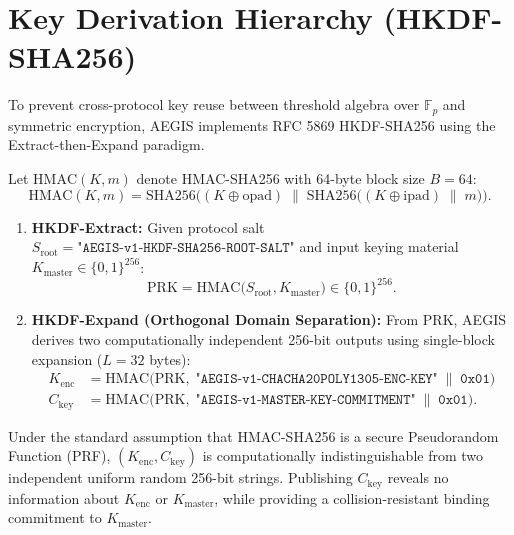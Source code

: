 \documentclass[11pt,a4paper]{article}
\theoremstyle{definition}
\newcommand{\Fp}{\mathbb{F}_p}
\newcommand{\concat}{\;\|\;}
\begin{document}
\section{Key Derivation Hierarchy (HKDF-SHA256)}

To prevent cross-protocol key reuse between threshold algebra over $\Fp$ and symmetric encryption, AEGIS implements RFC 5869 HKDF-SHA256 using the Extract-then-Expand paradigm.

Let $\mathrm{HMAC}(K, m)$ denote HMAC-SHA256 with 64-byte block size $B = 64$:
\begin{equation}
    \mathrm{HMAC}(K, m) = \mathrm{SHA256}\Big( (K \oplus \mathrm{opad}) \concat \mathrm{SHA256}\big( (K \oplus \mathrm{ipad}) \concat m \big) \Big).
\end{equation}

\begin{enumerate}[label=\textbf{Stage \arabic*:}]
    \item \textbf{HKDF-Extract:} Given protocol salt $S_{\mathrm{root}} = \texttt{"AEGIS-v1-HKDF-SHA256-ROOT-SALT"}$ and input keying material $K_{\mathrm{master}} \in \{0,1\}^{256}$:
    \begin{equation}
        \mathrm{PRK} = \mathrm{HMAC}\big(S_{\mathrm{root}}, K_{\mathrm{master}}\big) \in \{0,1\}^{256}.
    \end{equation}
    \item \textbf{HKDF-Expand (Orthogonal Domain Separation):} From $\mathrm{PRK}$, AEGIS derives two computationally independent 256-bit outputs using single-block expansion ($L = 32$ bytes):
    \begin{align}
        K_{\mathrm{enc}} &= \mathrm{HMAC}\big(\mathrm{PRK},\; \texttt{"AEGIS-v1-CHACHA20POLY1305-ENC-KEY"} \concat \texttt{0x01}\big) \\
        C_{\mathrm{key}} &= \mathrm{HMAC}\big(\mathrm{PRK},\; \texttt{"AEGIS-v1-MASTER-KEY-COMMITMENT"} \concat \texttt{0x01}\big).
    \end{align}
\end{enumerate}
Under the standard assumption that HMAC-SHA256 is a secure Pseudorandom Function (PRF), $(K_{\mathrm{enc}}, C_{\mathrm{key}})$ is computationally indistinguishable from two independent uniform random 256-bit strings. Publishing $C_{\mathrm{key}}$ reveals no information about $K_{\mathrm{enc}}$ or $K_{\mathrm{master}}$, while providing a collision-resistant binding commitment to $K_{\mathrm{master}}$.
\end{document}
